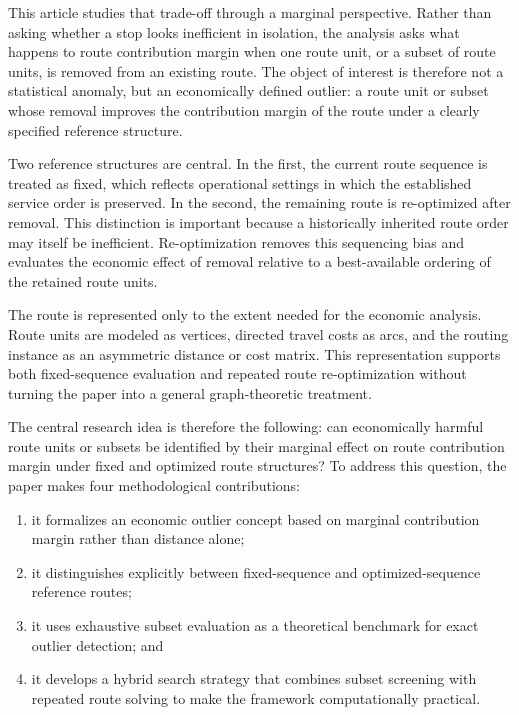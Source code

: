 \documentclass[preprint,12pt]{elsarticle}
\begin{document}
This article studies that trade-off through a marginal perspective. Rather than asking whether a stop looks inefficient in isolation, the analysis asks what happens to route contribution margin when one route unit, or a subset of route units, is removed from an existing route. The object of interest is therefore not a statistical anomaly, but an economically defined outlier: a route unit or subset whose removal improves the contribution margin of the route under a clearly specified reference structure.

Two reference structures are central. In the first, the current route sequence is treated as fixed, which reflects operational settings in which the established service order is preserved. In the second, the remaining route is re-optimized after removal. This distinction is important because a historically inherited route order may itself be inefficient. Re-optimization removes this sequencing bias and evaluates the economic effect of removal relative to a best-available ordering of the retained route units.

The route is represented only to the extent needed for the economic analysis. Route units are modeled as vertices, directed travel costs as arcs, and the routing instance as an asymmetric distance or cost matrix. This representation supports both fixed-sequence evaluation and repeated route re-optimization without turning the paper into a general graph-theoretic treatment.

The central research idea is therefore the following: can economically harmful route units or subsets be identified by their marginal effect on route contribution margin under fixed and optimized route structures? To address this question, the paper makes four methodological contributions:
\begin{enumerate}[label=(\roman*)]
\item it formalizes an economic outlier concept based on marginal contribution margin rather than distance alone;
\item it distinguishes explicitly between fixed-sequence and optimized-sequence reference routes;
\item it uses exhaustive subset evaluation as a theoretical benchmark for exact outlier detection; and
\item it develops a hybrid search strategy that combines subset screening with repeated route solving to make the framework computationally practical.
\end{enumerate}
\end{document}
